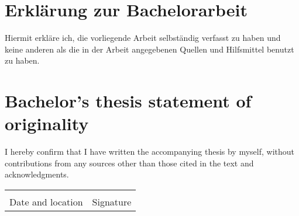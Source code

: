 \thispagestyle{empty}
\section*{Erklärung zur Bachelorarbeit}

Hiermit erkläre ich, die vorliegende Arbeit selbständig verfasst zu haben und keine anderen als die in der Arbeit angegebenen Quellen und Hilfsmittel benutzt zu haben.

\vspace*{2em}

\section*{Bachelor’s thesis statement of originality}

I hereby confirm that I have written the accompanying thesis by myself, without contributions from any sources other than those cited in the text and acknowledgments.

\vspace*{6em}

\noindent
\begin{tabular}{@{}p{17em}p{17em}@{}}
    \dotfill & \dotfill \\
    \centering Date and location & \centering Signature
\end{tabular}
